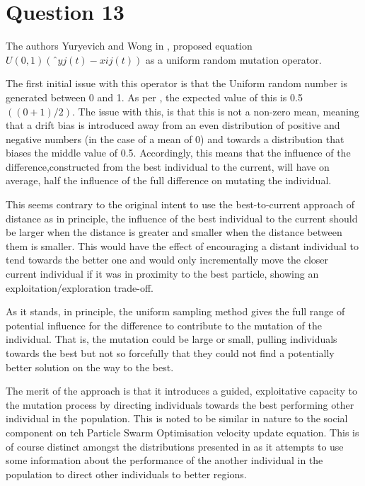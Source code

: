 \documentclass[12pt]{article}
\begin{document}
\section{Question 13}
The authors Yuryevich and Wong in \cite{yuryevich_wong_1999}, proposed equation 
    $U(0, 1)(ˆyj(t) − xij(t))$ as a uniform random mutation operator.

    The first initial issue with this operator is that the Uniform random number is generated between 0 and 1. As per \cite{wolframUniform}, the expected value of this is 0.5 $((0+1)/2)$. The issue with this, is that this is not a non-zero mean, meaning that a drift bias is introduced away from an even distribution of positive and negative numbers (in the case of a mean of 0) and towards a distribution that biases the middle value of 0.5. Accordingly, this means that the influence of the difference,constructed from the best individual to the current, will have on average, half the influence of the full difference on mutating the individual.

    This seems contrary to the original intent to use the best-to-current approach of distance as in principle, the influence of the best individual to the current should be larger when the distance is greater and smaller when the distance between them is smaller. This would have the effect of encouraging a distant individual to tend towards the better one and would only incrementally move the closer current individual if it was in proximity to the best particle, showing an exploitation/exploration trade-off.

    As it stands, in principle, the uniform sampling method gives the full range of potential influence for the difference to contribute to the mutation of the individual. That is, the mutation could be large or small, pulling individuals towards the best but not so forcefully that they could not find a potentially better solution on the way to the best.

    The merit of the approach is that it introduces a guided, exploitative capacity to the mutation process by directing individuals towards the best performing other individual in the population. This is noted to be similar in nature to the social component on teh Particle Swarm Optimisation velocity update equation. This is of course distinct amongst the distributions presented in \cite{engelCI02} as it attempts to use some information about the performance of the another individual in the  population to direct other individuals to better regions.
\end{document}
